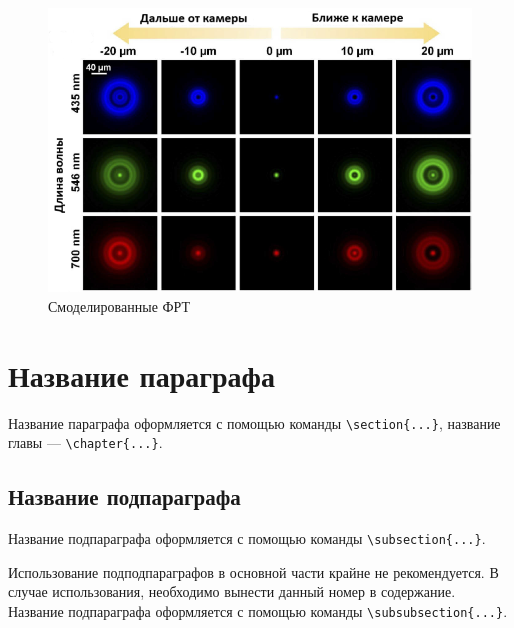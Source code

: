 \begin{figure}[ht] 
	\center
	\includegraphics [scale=0.8] {my_folder/images/PSF.png}
	\caption{Смоделированные ФРТ}
	\label{fig:PSF}
\end{figure}

\section{Название параграфа} \label{ch2:sec-abbr} %
	
Название параграфа оформляется с помощью команды \verb|\section{...}|, название главы --- \verb|\chapter{...}|. 
	

\subsection{Название подпараграфа} \label{ch2:subsec-title-abbr} %


Название подпараграфа оформляется с помощью команды  \texttt{\textbackslash{}subsection\{...\}}.


	
Использование подподпараграфов в основной части крайне не рекомендуется. В случае использования, необходимо вынести данный номер в содержание.	
Название подпараграфа оформляется с помощью команды  \texttt{\textbackslash{}subsubsecti\-on\{...\}}.



